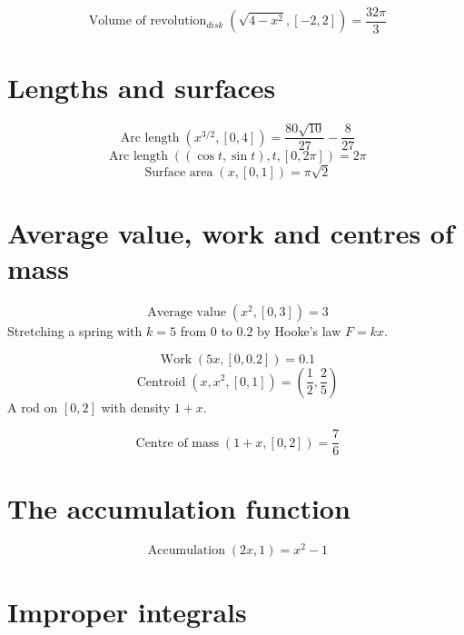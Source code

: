 \documentclass[11pt,a4paper]{article}
\theoremstyle{plain}
\theoremstyle{definition}
\theoremstyle{remark}
\begin{document}
\begin{equation*}
  \operatorname{Volume\ of\ revolution}_{disk}(\sqrt{4 - x^2}, [-2, 2]) = \frac{32 \pi}{3}
\end{equation*}
\section*{Lengths and surfaces}

\begin{equation*}
  \operatorname{Arc\ length}(x^{3/2}, [0, 4]) = \frac{80 \sqrt{10}}{27} - \frac{8}{27}
\end{equation*}
\begin{equation*}
  \operatorname{Arc\ length}((\cos t, \sin t), t, [0, 2\pi]) = 2 \pi
\end{equation*}
\begin{equation*}
  \operatorname{Surface\ area}(x, [0, 1]) = \pi \sqrt{2}
\end{equation*}
\section*{Average value, work and centres of mass}

\begin{equation*}
  \operatorname{Average\ value}(x^2, [0, 3]) = 3
\end{equation*}
Stretching a spring with $k = 5$ from $0$ to $0.2$ by Hooke's law $F = kx$.

\begin{equation*}
  \operatorname{Work}(5x, [0, 0.2]) = 0.1
\end{equation*}
\begin{equation*}
  \operatorname{Centroid}(x, x^2, [0, 1]) = \left(\frac{1}{2}, \frac{2}{5}\right)
\end{equation*}
A rod on $[0, 2]$ with density $1 + x$.

\begin{equation*}
  \operatorname{Centre\ of\ mass}(1 + x, [0, 2]) = \frac{7}{6}
\end{equation*}
\section*{The accumulation function}

\begin{equation*}
  \operatorname{Accumulation}(2x, 1) = x^{2} - 1
\end{equation*}
\section*{Improper integrals}
\end{document}
